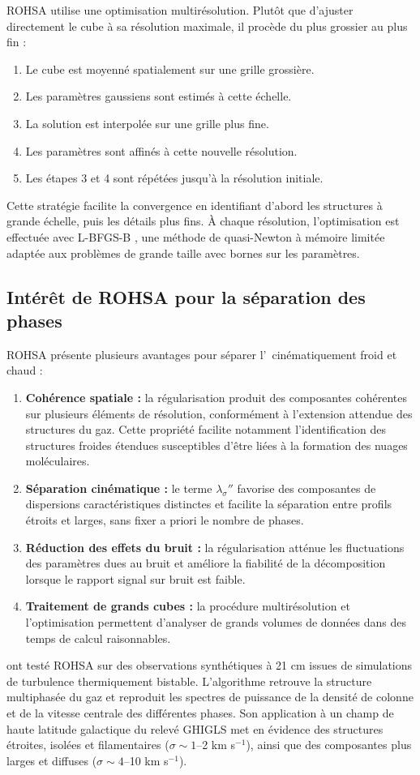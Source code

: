 ROHSA utilise une optimisation multirésolution. Plutôt que d'ajuster directement le cube à sa résolution maximale, il procède du plus grossier au plus fin :
\begin{enumerate}
\item Le cube est moyenné spatialement sur une grille grossière.
\item Les paramètres gaussiens sont estimés à cette échelle.
\item La solution est interpolée sur une grille plus fine.
\item Les paramètres sont affinés à cette nouvelle résolution.
\item Les étapes 3 et 4 sont répétées jusqu'à la résolution initiale.
\end{enumerate}
\noindent Cette stratégie facilite la convergence en identifiant d'abord les structures à grande échelle, puis les détails plus fins. À chaque résolution, l'optimisation est effectuée avec L-BFGS-B \citep{Byrd1995}, une méthode de quasi-Newton à mémoire limitée adaptée aux problèmes de grande taille avec bornes sur les paramètres.

\subsection{Intérêt de ROHSA pour la séparation des phases}

ROHSA présente plusieurs avantages pour séparer l'\HI\ cinématiquement froid et chaud :
\begin{enumerate}
\item \textbf{Cohérence spatiale :} la régularisation produit des composantes cohérentes sur plusieurs éléments de résolution, conformément à l'extension attendue des structures du gaz. Cette propriété facilite notamment l'identification des structures froides étendues susceptibles d'être liées à la formation des nuages moléculaires.
\item \textbf{Séparation cinématique :} le terme $\lambda_\sigma''$ favorise des composantes de dispersions caractéristiques distinctes et facilite la séparation entre profils étroits et larges, sans fixer a priori le nombre de phases.
\item \textbf{Réduction des effets du bruit :} la régularisation atténue les fluctuations des paramètres dues au bruit et améliore la fiabilité de la décomposition lorsque le rapport signal sur bruit est faible.
\item \textbf{Traitement de grands cubes :} la procédure multirésolution et l'optimisation permettent d'analyser de grands volumes de données dans des temps de calcul raisonnables.
\end{enumerate}
\noindent \citet{Marchal2019} ont testé ROHSA sur des observations synthétiques à 21 cm issues de simulations de turbulence thermiquement bistable. L'algorithme retrouve la structure multiphasée du gaz et reproduit les spectres de puissance de la densité de colonne et de la vitesse centrale des différentes phases. Son application à un champ de haute latitude galactique du relevé GHIGLS met en évidence des structures étroites, isolées et filamentaires ($\sigma \sim 1$--2 km s$^{-1}$), ainsi que des composantes plus larges et diffuses ($\sigma \sim 4$--10 km s$^{-1}$).

